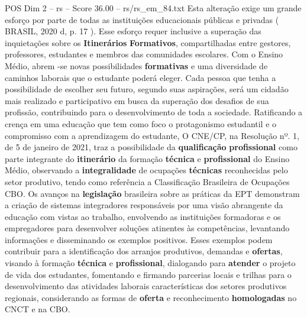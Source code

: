 \begin{textsample}{POS Dim 2 – rs – Score 36.00 – rs/rs\_em\_84.txt}
Esta alteração exige um grande esforço por parte de todas as instituições educacionais públicas e privadas ( BRASIL, 2020 d, p. 17 ).
Esse esforço requer inclusive a superação das inquietações sobre os \textbf{Itinerários} \textbf{Formativos}, compartilhadas entre gestores, professores, estudantes e membros das comunidades escolares.
Com o Ensino Médio, abrem -se novas possibilidades \textbf{formativas} e uma diversidade de caminhos laborais que o estudante poderá eleger.
Cada pessoa que tenha a possibilidade de escolher seu futuro, segundo suas aspirações, será um cidadão mais realizado e participativo em busca da superação dos desafios de sua profissão, contribuindo para o desenvolvimento de toda a sociedade.
Ratificando a crença em uma educação que tem como foco o protagonismo estudantil e o compromisso com a aprendizagem do estudante, O CNE/CP, na Resolução nº. 1, de 5 de janeiro de 2021, traz a possibilidade da \textbf{qualificação} \textbf{profissional} como parte integrante do \textbf{itinerário} da formação \textbf{técnica} e \textbf{profissional} do Ensino Médio, observando a \textbf{integralidade} de ocupações \textbf{técnicas} reconhecidas pelo setor produtivo, tendo como referência a Classificação Brasileira de Ocupações CBO.
Os avanços na \textbf{legislação} brasileira sobre as práticas da EPT demonstram a criação de sistemas integradores responsáveis por uma visão abrangente da educação com vistas ao trabalho, envolvendo as instituições formadoras e os empregadores para desenvolver soluções atinentes às competências, levantando informações e disseminando os exemplos positivos.
Esses exemplos podem contribuir para a identificação dos arranjos produtivos, demandas e \textbf{ofertas}, visando à formação \textbf{técnica} e \textbf{profissional}, dialogando para \textbf{atender} o projeto de vida dos estudantes, fomentando e firmando parcerias locais e trilhas para o desenvolvimento das atividades laborais características dos setores produtivos regionais, considerando as formas de \textbf{oferta} e reconhecimento \textbf{homologadas} no CNCT e na CBO.

\end{textsample}

